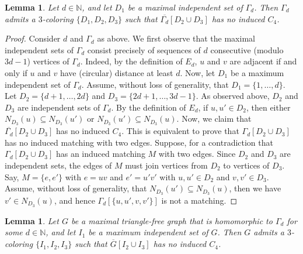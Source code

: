 \documentclass[a4paper,12pt]{article}
\newtheorem{lemma}[theorem]{Lemma}
\begin{document}

\begin{lemma}\label{lemma:andrasfai_coloring}
	Let \(d\in\mathbb{N}\),
	and let \(D_1\) be a maximal independent set of \(\Gamma_d\).
	Then \(\Gamma_d\) admits a \(3\)-coloring \(\{D_1,D_2,D_3\}\)
	such that \(\overline{\Gamma_d}[D_2\cup D_3]\) has no induced \(C_4\).
\end{lemma}

\begin{proof}
	Consider \(d\) and \(\Gamma_d\) as above.
	We first observe that the maximal independent sets of \(\Gamma_d\)
	consist precisely of sequences of \(d\) consecutive (modulo \(3d-1\)) vertices of \(\Gamma_d\).
	Indeed,	by the definition of \(E_d\), \(u\) and \(v\) are adjacent 
	if and only if \(u\) and \(v\) have (circular) distance at least \(d\).
	Now, let \(D_1\) be a maximum independent set of \(\Gamma_d\).
	Assume, without loss of generality, that \(D_1 = \{1,\ldots,d\}\).
	Let \(D_2 = \{d+1,\ldots,2d\}\) and \(D_3 = \{2d+1,\ldots, 3d-1\}\).
	As observed above, \(D_2\) and \(D_3\) are independent sets of \(\Gamma_d\).
	By the definition of \(E_d\), if \(u,u'\in D_2\),
	then either \(N_{D_3}(u) \subseteq N_{D_3}(u')\) or \(N_{D_3}(u') \subseteq N_{D_3}(u)\).
	Now, we claim that \(\overline{\Gamma_d}[D_2\cup D_3]\) has no induced \(C_4\).
	This is equivalent to prove that \(\Gamma_d[D_2\cup D_3]\) has no induced matching with two edges.
	Suppose, for a contradiction that \(\Gamma_d[D_2\cup D_3]\) has an induced matching \(M\) with two edges.
	Since \(D_2\) and \(D_3\) are independent sets, the edges of \(M\) must join vertices from \(D_2\) to vertices of \(D_3\).
	Say, \(M = \{e,e'\}\) with \(e = uv\) and \(e' = u'v'\) with \(u,u' \in D_2\) and \(v,v'\in D_3\).
	Assume, without loss of generality, that \(N_{D_3}(u') \subseteq N_{D_3}(u)\),
	then we have \(v' \in N_{D_3}(u)\), and hence \(\Gamma_d[\{u,u',v,v'\}]\) is not a matching.
\end{proof}

\begin{lemma}\label{lemma:andrasfai_blowup_coloring}
	Let \(G\) be a maximal triangle-free graph that is homomorphic to \(\Gamma_d\)
	for some \(d\in \mathbb{N}\),
	and let \(I_1\) be a maximum independent set of \(G\).
	Then \(G\) admits a \(3\)-coloring \(\{I_1,I_2,I_3\}\)
	such that \(\overline{G}[I_2\cup I_3]\) has no induced \(C_4\).
\end{lemma}
\end{document}

